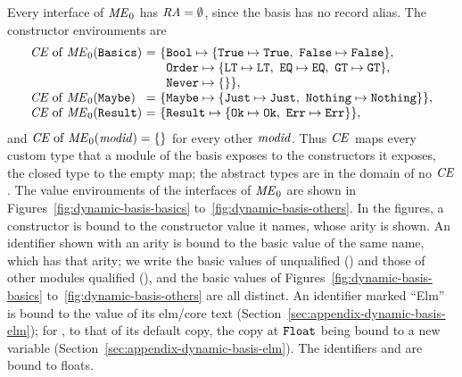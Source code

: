 Every interface of $\mathit{ME}_0$ has $\mathit{RA}=\emptyset$, since the basis has no
record alias. The constructor environments are
\[
\begin{array}{@{}l@{\ =\ }l@{}}
  \dmCE\of\ME_0(\kw{Basics}) &
    \{\kw{Bool}\mapsto\{\kw{True}\mapsto\kw{True},\ \kw{False}\mapsto\kw{False}\},\\
  \multicolumn{1}{l}{} & \phantom{\{}\kw{Order}\mapsto\{\kw{LT}\mapsto\kw{LT},\
    \kw{EQ}\mapsto\kw{EQ},\ \kw{GT}\mapsto\kw{GT}\},\\
  \multicolumn{1}{l}{} & \phantom{\{}\kw{Never}\mapsto\emptymap\},\\
  \dmCE\of\ME_0(\kw{Maybe}) &
    \{\kw{Maybe}\mapsto\{\kw{Just}\mapsto\kw{Just},\ \kw{Nothing}\mapsto\kw{Nothing}\}\},\\
  \dmCE\of\ME_0(\kw{Result}) &
    \{\kw{Result}\mapsto\{\kw{Ok}\mapsto\kw{Ok},\ \kw{Err}\mapsto\kw{Err}\}\},
\end{array}
\]
and $\mathit{CE}\mathrel{\mathrm{of}}\mathit{ME}_0(\mathit{modid})=\{\}$ for every other $\mathit{modid}$. Thus $\mathit{CE}$
maps every custom type that a module of the basis exposes to the constructors
it exposes, the closed type \kw{Never} to the empty map; the abstract types
are in the domain of no $\mathit{CE}$. %
The value environments of the interfaces of $\mathit{ME}_0$ are shown in
Figures~\ref{fig:dynamic-basis-basics} to~\ref{fig:dynamic-basis-others}.
In the figures, a constructor is bound to the constructor value it names,
whose arity is shown. An identifier shown with an arity is bound to the basic
value of the same name, which has that arity; we write the basic values of
\kw{Basics} unqualified (\kw{add}) and those of other modules qualified
(\kw{Debug.log}), and the basic values of
Figures~\ref{fig:dynamic-basis-basics} to~\ref{fig:dynamic-basis-others} are
all distinct. An identifier marked ``Elm'' is bound to the value of its
elm/core text (Section~\ref{sec:appendix-dynamic-basis-elm}); for ,
to that of its default copy, the copy at $\mathtt{Float}$ being bound to a new
variable (Section~\ref{sec:appendix-dynamic-basis-elm}). %
The identifiers
 and  are bound to floats.

